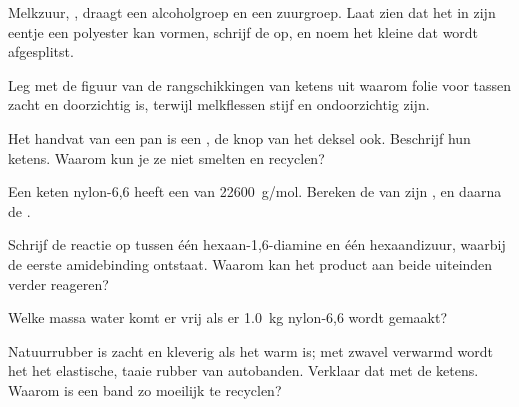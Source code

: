 \begin{exercise}[$\star\star$]\label{exo:g12:polymers:8}
Melkzuur, , draagt een alcoholgroep en een zuurgroep.
Laat zien dat het in zijn eentje een polyester kan vormen, schrijf de
 op, en noem het kleine  dat wordt
afgesplitst.
\end{exercise}

\begin{exercise}[$\star\star$]\label{exo:g12:polymers:9}
Leg met de figuur van de rangschikkingen van ketens uit waarom folie
voor tassen zacht en doorzichtig is, terwijl melkflessen stijf en
ondoorzichtig zijn.
\end{exercise}

\begin{exercise}[$\star\star$]\label{exo:g12:polymers:10}
Het handvat van een pan is een , de  knop van het
deksel ook. Beschrijf hun ketens. Waarom kun je ze niet smelten en
recyclen?
\end{exercise}

\begin{exercise}[$\star\star$]\label{exo:g12:polymers:11}
Een keten nylon-6,6 heeft een  van \qty{22600}{g/mol}.
Bereken de  van zijn  , en
daarna de .
\end{exercise}

\begin{exercise}[$\star\star\star$]\label{exo:g12:polymers:12}
Schrijf de reactie op tussen één  hexaan-1,6-diamine en één
 hexaandizuur, waarbij de eerste amidebinding ontstaat. Waarom kan
het product aan beide uiteinden verder reageren?
\end{exercise}

\begin{exercise}[$\star\star\star$]\label{exo:g12:polymers:13}
Welke massa water komt er vrij als er \qty{1.0}{kg} nylon-6,6 wordt
gemaakt?
\end{exercise}

\begin{exercise}[$\star\star\star$]\label{exo:g12:polymers:14}
Natuurrubber is zacht en kleverig als het warm is; met zwavel verwarmd
wordt het het elastische, taaie rubber van autobanden. Verklaar dat met
de ketens. Waarom is een band zo moeilijk te recyclen?
\end{exercise}

